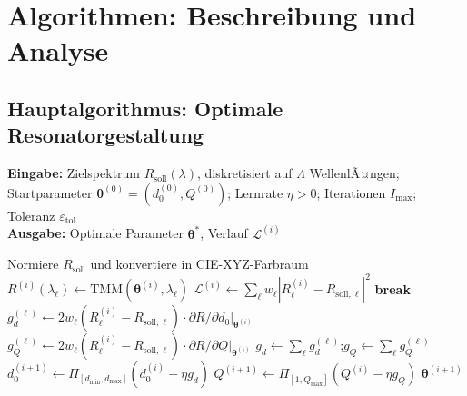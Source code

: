 ﻿\documentclass[a4paper,12pt]{article}
\theoremstyle{definition}
\newcommand{\vect}[1]{\bm{#1}}
\begin{document}
	\section{Algorithmen: Beschreibung und Analyse}
	\label{sec:algorithmen}
	
	\subsection{Hauptalgorithmus: Optimale Resonatorgestaltung}
	
	\begin{algorithm}[htb]
		\caption{Optimale Resonatorgestaltung durch adjungierten Gradientenabstieg}
		\label{alg:hauptalgorithmus}
		\textbf{Eingabe:} Zielspektrum $R_\mathrm{soll}(\lambda)$, diskretisiert
		auf $\Lambda$ WellenlÃ¤ngen; Startparameter $\vect{\theta}^{(0)} = (d_0^{(0)}, Q^{(0)})$;
		Lernrate $\eta > 0$; Iterationen $I_\mathrm{max}$; Toleranz $\varepsilon_\mathrm{tol}$\\
		\textbf{Ausgabe:} Optimale Parameter $\vect{\theta}^*$, Verlauf $\mathcal{L}^{(i)}$
		\begin{algorithmic}[1]
			\State Normiere $R_\mathrm{soll}$ und konvertiere in CIE-XYZ-Farbraum
			 
			\State $R^{(i)}(\lambda_\ell) \gets \mathrm{TMM}(\vect{\theta}^{(i)}, \lambda_\ell)$
			\EndFor
			\State $\mathcal{L}^{(i)} \gets \sum_\ell w_\ell |R^{(i)}_\ell - R_{\mathrm{soll},\ell}|^2$
			\State \textbf{break} 
			\EndIf
			 
			\State $g_d^{(\ell)} \gets 2w_\ell(R^{(i)}_\ell - R_{\mathrm{soll},\ell})
			\cdot \partial R/\partial d_0|_{\vect{\theta}^{(i)}}$
			\State $g_Q^{(\ell)} \gets 2w_\ell(R^{(i)}_\ell - R_{\mathrm{soll},\ell})
			\cdot \partial R/\partial Q|_{\vect{\theta}^{(i)}}$
			\EndFor
			\State $g_d \gets \sum_\ell g_d^{(\ell)}$;\quad $g_Q \gets \sum_\ell g_Q^{(\ell)}$
			\State $d_0^{(i+1)} \gets \Pi_{[d_\mathrm{min}, d_\mathrm{max}]}\!\left(d_0^{(i)} - \eta g_d\right)$
			\State $Q^{(i+1)} \gets \Pi_{[1, Q_\mathrm{max}]}\!\left(Q^{(i)} - \eta g_Q\right)$
			\EndFor
			\State \Return $\vect{\theta}^{(i+1)}$
		\end{algorithmic}
	\end{algorithm}
	
\end{document}
